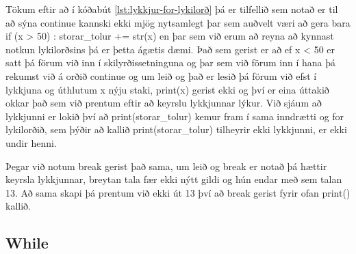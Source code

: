 Tökum eftir að í kóðabút \ref{lst:lykkjur-for-lykilorð} þá er tilfellið sem notað er til að sýna continue kannski ekki mjög nytsamlegt þar sem auðvelt væri að gera bara if (x > 50) : storar\_tolur += str(x) en þar sem við erum að reyna að kynnast notkun lykilorðsins þá er þetta ágætis dæmi.
Það sem gerist er að ef x < 50 er satt þá förum við inn í skilyrðissetninguna og þar sem við förum inn í hana þá rekumst við á orðið continue og um leið og það er lesið þá förum við efst í lykkjuna og úthlutum x nýju staki, print(x) gerist ekki og því er eina úttakið okkar það sem við prentum eftir að keyrslu lykkjunnar lýkur.
Við sjáum að lykkjunni er lokið því að print(storar\_tolur) kemur fram í sama inndrætti og for lykilorðið, sem þýðir að kallið print(storar\_tolur) tilheyrir ekki lykkjunni, er ekki undir henni.

Þegar við notum break gerist það sama, um leið og break er notað þá hættir keyrsla lykkjunnar, breytan tala fær ekki nýtt gildi og hún endar með sem talan 13.
Að sama skapi þá prentum við ekki út 13 því að break gerist fyrir ofan print() kallið.

\subsection{While}